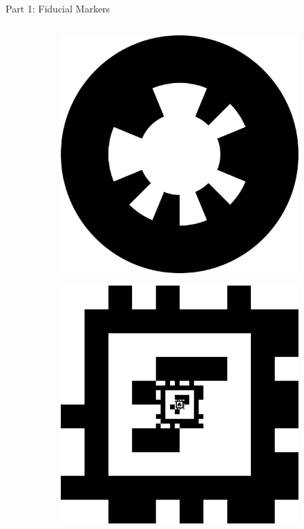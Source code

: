 \documentclass[aspectratio=169]{beamer}
\begin{document}
\begin{frame}{Part 1: Fiducial Markers}
\begin{columns}
\begin{column}{0.37\textwidth}
\begin{figure}[]
		    \begin{subfigure}[b]{0.45\linewidth}
			\includegraphics[width=\textwidth]{./images/whycode_20_8}
			\label{figure:whycode_single}
		    \end{subfigure}
		    \begin{subfigure}[b]{0.45\linewidth}
			\includegraphics[width=\textwidth]{./images/tagCustom48h12_00002_00001_00000}

\end{subfigure}
\end{figure}
\end{column}
\end{columns}
\end{frame}
\end{document}
